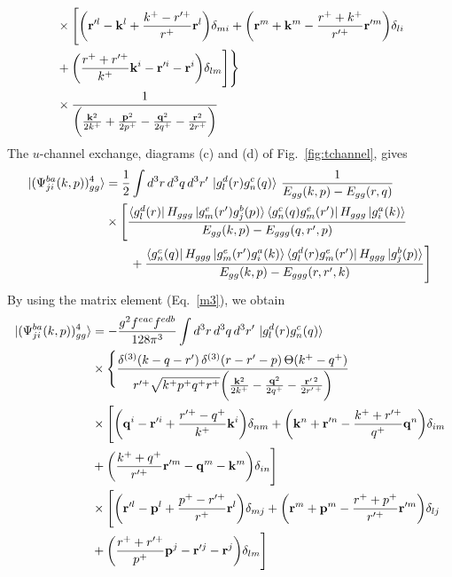 \documentclass[a4paper,11pt]{article}
\def\v#1{\mathbf{#1}}
\begin{document}
{\begin{align}
& \times\Bigg[\bigg(\v{r}^{\prime l}-\v{k}^{l}+\frac{k^{+}-r^{\prime +}}{r^{+}}\v{r}^{l}\bigg)\delta_{mi}+\bigg(\v{r}^{m}+\v{k}^{m}-\frac{r^{+}+k^{+}}{r^{\prime +}}\v{r}^{\prime m}\bigg)\delta_{li}\notag \\ & +\bigg(\frac{r^{+}+r^{\prime +}}{k^{+}}\v{k}^{i}-\v{r}^{\prime i}-\v{r}^{i}\bigg)\delta_{lm}\Bigg]\Bigg\}\notag \\
& \times \frac{1}{\bigg(\frac{\v{k}^{2}}{2k^{+}}+\frac{\v{p}^{2}}{2p^{+}}-\frac{\v{q}^{2}}{2q^{+}}-\frac{\v{r}^{2}}{2r^{+}}\bigg)}
\end{align}
The $u$-channel exchange, diagrams (c) and (d) of Fig.~\ref{fig:tchannel}, gives
\begin{align}
\ket{(\Psi^{ba}_{ji}(k,p))^{4}_{gg}} & = \frac{1}{2}\int d^{3}r\, d^{3}q\, d^{3}r^{\prime}\, \ket{g^{d}_{l}(r)g^{c}_{n}(q)}\,\frac{1}{E_{gg}(k,p)-E_{gg}(r,q)}\notag \\
& \times\Bigg[\frac{\bra{g^{d}_{l}(r)}H_{ggg}\ket{g^{e}_{m}(r^{\prime})g^{b}_{j}(p)}\bra{g^{c}_{n}(q)g^{e}_{m}(r^{\prime})}H_{ggg}\ket{g^{a}_{i}(k)}}{E_{gg}(k,p)-E_{ggg}(q,r^{\prime},p)}\notag \\ & \qquad +\frac{\bra{g^{c}_{n}(q)}H_{ggg}\ket{g^{e}_{m}(r^{\prime})g^{a}_{i}(k)}\bra{g^{d}_{l}(r)g^{e}_{m}(r^{\prime})}H_{ggg}\ket{g^{b}_{j}(p)}}{E_{gg}(k,p)-E_{ggg}(r,r^{\prime},k)}\Bigg]
\end{align}
By using the matrix element (Eq.~\eqref{m3}), we obtain
\begin{align}\label{eq:uch}
\ket{(\Psi^{ba}_{ji}(k,p))^{4}_{gg}} & = -\frac{g^{2}f^{eac}f^{edb}}{128\pi^{3}}\int d^{3}r\, d^{3}q\, d^{3}r^{\prime}\, \ket{g^{d}_{l}(r)g^{c}_{n}(q)}\notag \\
& \times\Bigg\{\frac{\delta^{(3)}(k-q-r^{\prime})\,\delta^{(3)}(r-r^{\prime}-p)\,\Theta(k^{+}-q^{+})}{r^{\prime +}\sqrt{k^{+}p^{+}q^{+}r^{+}}\bigg(\frac{\v{k}^{2}}{2k^{+}}-\frac{\v{q}^{2}}{2q^{+}}-\frac{\v{r}^{\prime\,2}}{2r^{\prime\,+}}\bigg)}\notag \\
& \times\Bigg[\bigg(\v{q}^{i}-\v{r}^{\prime i}+\frac{r^{\prime +}-q^{+}}{k^{+}}\v{k}^{i}\bigg)\delta_{nm}+\bigg(\v{k}^{n}+\v{r}^{\prime n}-\frac{k^{+}+r^{\prime +}}{q^{+}}\v{q}^{n}\bigg)\delta_{im}\notag \\ & +\bigg(\frac{k^{+}+q^{+}}{r^{\prime +}}\v{r}^{\prime m}-\v{q}^{m}-\v{k}^{m}\bigg)\delta_{in}\Bigg]\notag \\
& \times\Bigg[\bigg(\v{r}^{\prime l}-\v{p}^{l}+\frac{p^{+}-r^{\prime +}}{r^{+}}\v{r}^{l}\bigg)\delta_{mj}+\bigg(\v{r}^{m}+\v{p}^{m}-\frac{r^{+}+p^{+}}{r^{\prime +}}\v{r}^{\prime m}\bigg)\delta_{lj}\notag \\ & +\bigg(\frac{r^{+}+r^{\prime +}}{p^{+}}\v{p}^{j}-\v{r}^{\prime j}-\v{r}^{j}\bigg)\delta_{lm}\Bigg]\notag \\

\end{align}}
\end{document}
